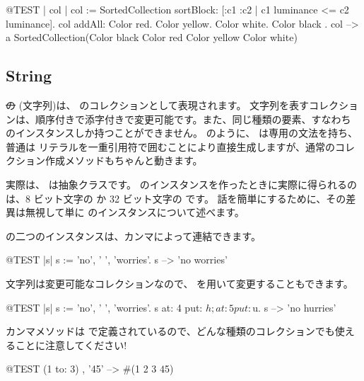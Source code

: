 \documentclass[a4paper,10pt,twoside]{book}
\begin{document}
\begin{code}{@TEST | col |}
col := SortedCollection sortBlock: [:c1 :c2 | c1 luminance <= c2 luminance].
col addAll: { Color red. Color yellow. Color white. Color black }.
col --> a SortedCollection(Color black Color red Color yellow Color white)
\end{code}

\subsection{String}
\st の  (文字列)は、 のコレクションとして表現されます。
文字列を表すコレクションは、順序付きで添字付きで変更可能です。また、同じ種類の要素、すなわち  のインスタンスしか持つことができません。
 のように、 は専用の文法を持ち、普通は  リテラルを一重引用符で囲むことにより直接生成しますが、通常のコレクション作成メソッドもちゃんと動きます。


実際は、 は抽象クラスです。
 のインスタンスを作ったときに実際に得られるのは、8 ビット文字の  か 32 ビット文字の  です。
話を簡単にするために、その差異は無視して単に  のインスタンスについて述べます。

 の二つのインスタンスは、カンマによって連結できます。%
\begin{code}{@TEST |s|}
s := 'no', ' ', 'worries'.
s -->  'no worries'
\end{code}

文字列は変更可能なコレクションなので、 を用いて変更することもできます。

\begin{code}{@TEST |s| s := 'no', ' ', 'worries'.}
s at: 4 put: $h; at: 5 put: $u.
s --> 'no hurries'
\end{code}

カンマメソッドは  で定義されているので、どんな種類のコレクションでも使えることに注意してください!
\begin{code}{@TEST}
(1 to: 3) , '45' --> #(1 2 3 $4 $5)
\end{code}
\end{document}
